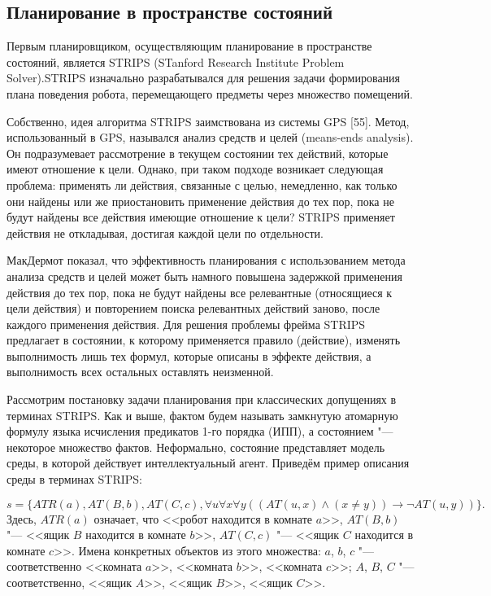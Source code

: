 \documentclass[b5paper,11pt]{book}
\begin{document}
	\subsection{Планирование в пространстве состояний}
	
	Первым планировщиком, осуществляющим планирование в пространстве состояний, является STRIPS (STanford Research Institute Problem Solver).STRIPS изначально разрабатывался для решения задачи формирования плана поведения робота, перемещающего предметы через множество помещений.
	
	Собственно, идея алгоритма STRIPS заимствована из системы GPS [55]. Метод, использованный в GPS, назывался анализ средств и целей (means-ends analysis). Он подразумевает рассмотрение в текущем состоянии тех действий, которые имеют отношение к цели. Однако, при таком подходе возникает следующая проблема: применять ли действия, связанные с целью, немедленно, как только они найдены или же приостановить применение действия до тех пор, пока не будут найдены все действия имеющие отношение к цели? STRIPS применяет действия не откладывая, достигая каждой цели по отдельности.
	
	МакДермот показал, что эффективность планирования с использованием метода анализа средств и целей может быть намного повышена задержкой применения действия до тех пор, пока не будут найдены все релевантные (относящиеся к цели действия) и повторением поиска релевантных действий заново, после каждого применения действия.	Для решения проблемы фрейма STRIPS предлагает в состоянии, к которому применяется правило (действие), изменять выполнимость лишь тех формул, которые описаны в эффекте действия, а выполнимость всех остальных оставлять неизменной.
	
	Рассмотрим постановку задачи планирования при классических допущениях в терминах STRIPS.	Как и выше, фактом будем называть замкнутую атомарную формулу языка исчисления предикатов 1-го порядка (ИПП), а состоянием "--- некоторое множество фактов. Неформально, состояние представляет модель среды, в которой действует  интеллектуальный агент.
	Приведём пример описания среды в терминах STRIPS:
	
	\[
		s = \{ATR(a), AT(B,b), AT(C,c), \forall u\forall x\forall y ((AT(u,x) \wedge (x \not= y)) \rightarrow \neg AT(u,y))\}.
	\]
	Здесь, $ATR(a)$ означает, что <<робот находится в комнате $a$>>, $AT(B,b)$ "--- <<ящик $B$ находится в комнате $b$>>, $AT(C,c)$ "--- <<ящик $C$ находится в комнате $c$>>. Имена конкретных объектов из этого множества: $a$, $b$, $c$ "--- соответственно <<комната $a$>>, <<комната $b$>>, <<комната $c$>>; $A$, $B$, $C$ "--- соответственно, <<ящик $A$>>, <<ящик $B$>>, <<ящик $C$>>.
	
\end{document}
